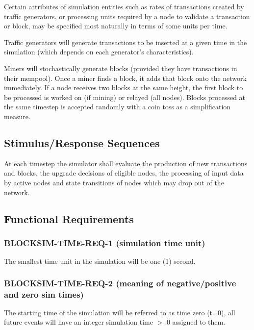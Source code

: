\documentclass{scrreprt}
\begin{document}
      Certain attributes of simulation entities such as rates of transactions
      created by traffic generators, or processing units required by a node
      to validate a transaction or block, may be specified most naturally in
      terms of some units per time.

      Traffic generators will generate transactions to be inserted at a given
      time in the simulation (which depends on each generator's
      characteristics).

      Miners will stochastically generate blocks (provided they have
      transactions in their mempool).
      Once a miner finds a block, it adds that block onto the network immediately.
      If a node receives two blocks at the same height, the first block to be
      processed is worked on (if mining) or relayed (all nodes).
      Blocks processed at the same timestep is accepted randomly with a coin
      toss as a simplification measure.

    \subsection{Stimulus/Response Sequences}

      At each timestep the simulator shall evaluate the production of new
      transactions and blocks, the upgrade decisions of eligible nodes,
      the processing of input data by active nodes and state transitions
      of nodes which may drop out of the network.

    \subsection{Functional Requirements}

      \subsubsection{BLOCKSIM-TIME-REQ-1 (simulation time unit)}

        The smallest time unit in the simulation will be one (1) second.

      \subsubsection{BLOCKSIM-TIME-REQ-2 (meaning of negative/positive and zero sim times)}

        The starting time of the simulation will be referred to as time zero
        (t=0), all future events will have an integer simulation time $>$ 0
        assigned to them.
\end{document}
